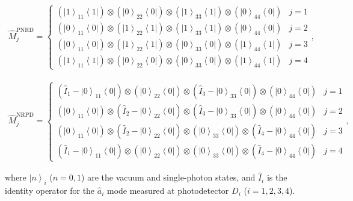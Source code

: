 \documentclass[aps,twocolumn,secnumarabic,amsmath,amssymb,pra,groupedaddress,
showpacs, showkeys]{revtex4-1}
\newcommand{\bra}[1]{\left\langle #1 \right|}
\newcommand{\ket}[1]{\left|#1\right\rangle}
\newcommand{\pna}[1]{\left(#1\right)}
\begin{document}
\begin{widetext}
\begin{align}
    \hat{M}_j^{\textrm{PNRD}} = \left\{
	\begin{array}{lr}
\pna{\ket{1}_{11}\bra{1}}\otimes\pna{\ket{0}_{22}\bra{0}}\otimes\pna{\ket{1}_{33}\bra{1}}\otimes\pna{\ket{0}_{44}\bra{0}} & j=1\\
\pna{\ket{0}_{11}\bra{0}}\otimes\pna{\ket{1}_{22}\bra{1}}\otimes\pna{\ket{1}_{33}\bra{1}}\otimes\pna{\ket{0}_{44}\bra{0}} & j=2\\
\pna{\ket{0}_{11}\bra{0}}\otimes\pna{\ket{1}_{22}\bra{1}}\otimes\pna{\ket{0}_{33}\bra{0}}\otimes\pna{\ket{1}_{44}\bra{1}} & j=3\\
\pna{\ket{1}_{11}\bra{1}}\otimes\pna{\ket{0}_{22}\bra{0}}\otimes\pna{\ket{0}_{33}\bra{0}}\otimes\pna{\ket{1}_{44}\bra{1}} & j=4
	\end{array}
	\right.,
\end{align}


\begin{align}
    \hat{M}_j^{\textrm{NRPD}} = \left\{
	\begin{array}{lr}
\pna{\hat{I}_1-\ket{0}_{11}\bra{0}}\otimes\pna{\ket{0}_{22}\bra{0}}\otimes\pna{\hat{I}_3-\ket{0}_{33}\bra{0}}\otimes\pna{\ket{0}_{44}\bra{0}} & j=1\\
\pna{\ket{0}_{11}\bra{0}}\otimes\pna{\hat{I}_2-\ket{0}_{22}\bra{0}}\otimes\pna{\hat{I}_3-\ket{0}_{33}\bra{0}}\otimes\pna{\ket{0}_{44}\bra{0}} & j=2\\
\pna{\ket{0}_{11}\bra{0}}\otimes\pna{\hat{I}_2-\ket{0}_{22}\bra{0}}\otimes\pna{\ket{0}_{33}\bra{0}}\otimes\pna{\hat{I}_4-\ket{0}_{44}\bra{0}} & j=3\\
\pna{\hat{I}_1-\ket{0}_{11}\bra{0}}\otimes\pna{\ket{0}_{22}\bra{0}}\otimes\pna{\ket{0}_{33}\bra{0}}\otimes\pna{\hat{I}_4-\ket{0}_{44}\bra{0}} & j=4
	\end{array}
	\right.,
	\label{eq:chap3:meas_povm}
\end{align}
\end{widetext}
where $\ket{n}_i$ ($n=0,1$) are the vacuum and single-photon states, and
$\hat{I}_i$ is the identity operator for the $\hat{a}_i$ mode measured at
photodetector $D_i$ ($i=1,2,3,4$).
\end{document}
